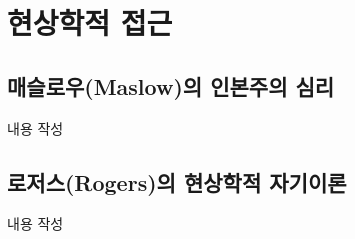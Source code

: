 \section{현상학적 접근}

\subsection{매슬로우(Maslow)의 인본주의 심리}
내용 작성

\subsection{로저스(Rogers)의 현상학적 자기이론}
내용 작성
